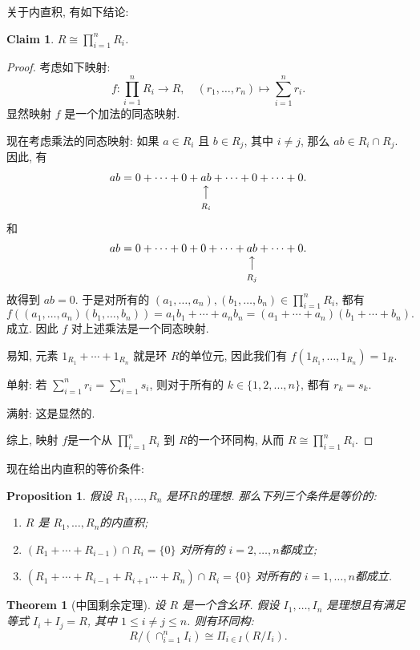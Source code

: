 \documentclass[a4paper,12pt]{ctexart}
\makeatletter
\newtheorem{theorem}{Theorem}
\newtheorem{proof}{Proof}
\newtheorem{proposition}{Proposition}
\newtheorem{claim}{Claim}
\newcommand\vertarrowbox[3][3ex]{%
  \begin{array}[t]{@{}c@{}} #2 \\
  \left\uparrow\vcenter{\hrule height #1}\right.\kern-\nulldelimiterspace\\
  \makebox[0pt]{\scriptsize#3}
  \end{array}%
}
\makeatother
\begin{document}
  关于内直积, 有如下结论: 
  \begin{claim}
    $ R\cong\prod_{i=1}^n R_i $.
  \end{claim}
  \begin{proof}
  考虑如下映射: 
  \[f: \prod_{i=1}^n R_i\rightarrow R,\quad(r_1,\dots,r_n)\mapsto\sum_{i=1}^nr_i.\]
  显然映射 $ f $ 是一个加法的同态映射.
  
  现在考虑乘法的同态映射: 如果 $ a\in R_i $ 且 $ b\in R_j $, 其中 $ i\ne j $, 那么 $ ab\in R_i\cap R_j $. 
  因此, 有
  \[ ab=0+\cdots+0+\vertarrowbox{ab}{$ R_i $}+\cdots+0+\cdots +0. \] 
  和
  \[ ab=0+\cdots+0+0+\cdots+\vertarrowbox{ab}{$ R_j $}+\cdots +0. \] 
  故得到 $ ab=0 $. 
  于是对所有的 $ (a_1,\dots,a_n), (b_1,\dots,b_n)\in \prod_{i=1}^n R_i $, 
  都有 
  \[ f((a_1,\dots,a_n)(b_1,\dots,b_n))=a_1b_1+\cdots+a_nb_n=(a_1+\cdots+a_n)(b_1+\cdots+b_n) .\]
  成立. 因此 $ f $ 对上述乘法是一个同态映射.
  
  易知, 元素 $ 1_{R_1}+\cdots+1_{R_n}$ 就是环 $ R $的单位元, 因此我们有 $ f(1_{R_1},\dots,1_{R_n})=1_R $.
  
  单射: 若 $\sum_{i=1}^n r_i=\sum_{i=1}^n s_i $, 则对于所有的 $ k\in\{1,2,...,n\} $, 都有 $ r_k=s_k $.
  
  满射: 这是显然的.

  综上, 映射 $ f $是一个从 $ \prod_{i=1}^n R_i $ 到 $ R $的一个环同构, 从而 $ R\cong\prod_{i=1}^n R_i $.
  \end{proof}
  现在给出内直积的等价条件: 
  \begin{proposition}
    假设 $ R_1,\dots,R_n $ 是环$ R $的理想. 那么下列三个条件是等价的: 
    \begin{enumerate}[label=(\arabic{*})]
      \item $ R $ 是 $R_1,\dots,R_n $的内直积; 
      \item $ (R_1+\cdots +R_{i-1})\cap R_i=\{0\} $ 对所有的 $ i=2,\dots , n $都成立; 
      \item $ (R_1+\cdots +R_{i-1}+R_{i+1}\cdots +R_n)\cap R_i=\{0\} $ 对所有的 $ i=1,\dots , n $都成立.
    \end{enumerate}
  \end{proposition}
  
  \begin{theorem}[中国剩余定理] 
  设 $ R $ 是一个含幺环. 假设 $ I_1,\dots,I_n $ 是理想且有满足等式 $ I_i+I_j=R $, 其中 $ 1\leq i\neq j\leq n $.
  则有环同构: 
  \[R/(\cap_{i=1}^nI_i)\cong \Pi_{i\in I}(R/I_i).\]
  \end{theorem}
\end{document}
